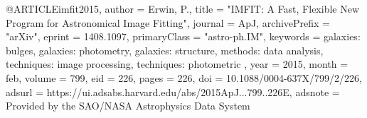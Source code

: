 
@ARTICLE{imfit2015,
   author = {{Erwin}, P.},
    title = "{IMFIT: A Fast, Flexible New Program for Astronomical Image Fitting}",
  journal = {ApJ},
archivePrefix = "arXiv",
   eprint = {1408.1097},
 primaryClass = "astro-ph.IM",
 keywords = {galaxies: bulges, galaxies: photometry, galaxies: structure, methods: data analysis, techniques: image processing, techniques: photometric },
     year = 2015,
    month = feb,
   volume = 799,
      eid = {226},
    pages = {226},
      doi = {10.1088/0004-637X/799/2/226},
   adsurl = {https://ui.adsabs.harvard.edu/abs/2015ApJ...799..226E},
  adsnote = {Provided by the SAO/NASA Astrophysics Data System}
}

